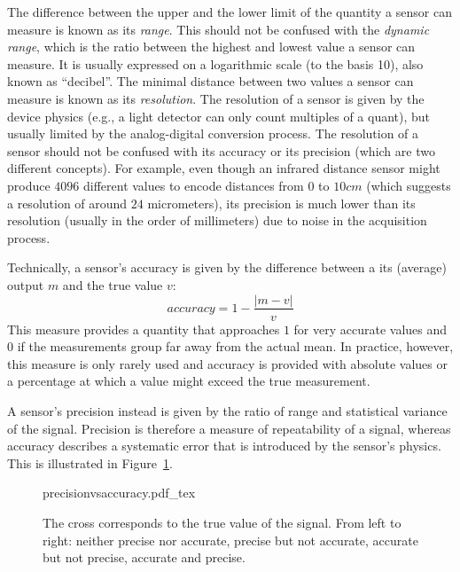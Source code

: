 The difference between the upper and the lower limit of the quantity a sensor can measure is known as its \textsl{range}. This should not be confused with the  \textsl{dynamic range}, which is the ratio between the highest and lowest value a sensor can measure. It is usually expressed on a logarithmic scale (to the basis 10), also known as ``decibel''. The minimal distance between two values a sensor can measure is known as its  \textsl{resolution}. The resolution of a sensor is given by the device physics (e.g., a light detector can only count multiples of a quant), but usually limited by the analog-digital conversion process. The resolution of a sensor should not be confused with its accuracy or its precision (which are two different concepts). For example, even though an infrared distance sensor might produce $4096$ different values to encode distances from $0$ to $10cm$ (which suggests a resolution of around $24$ micrometers), its precision is much lower than its resolution (usually in the order of millimeters) due to noise in the acquisition process.

Technically, a sensor's accuracy  is given by the difference between a its (average) output $m$ and the true value $v$:
\begin{equation}
accuracy=1-\frac{|m-v|}{v}
\end{equation}
This measure provides a quantity that approaches $1$ for very accurate values and $0$ if the measurements group far away from the actual mean. In practice, however, this measure is only rarely used and accuracy is provided with absolute values or a percentage at which a value might exceed the true measurement.

A sensor's precision  instead is given by the ratio of range and statistical variance of the signal. Precision is therefore a measure of repeatability of a signal, whereas accuracy describes a systematic error that is introduced by the sensor's physics. This is illustrated in Figure~\ref{fig:precision}.
\begin{figure}
	\centering
	\def\svgwidth{0.9\textwidth}
    {precisionvsaccuracy.pdf_tex}
	\caption{The cross corresponds to the true value of the signal. From left to right: neither precise nor accurate, precise but not accurate, accurate but not precise, accurate and precise.
	\label{fig:precision}}
\end{figure}

